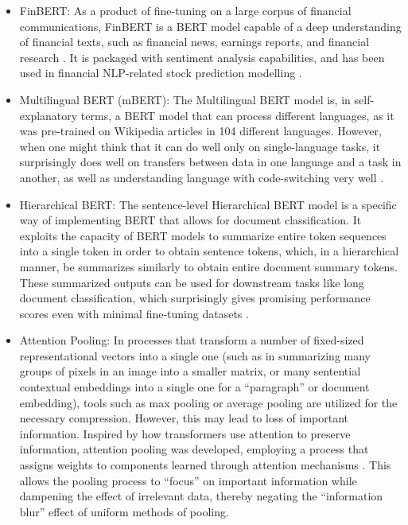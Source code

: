 \documentclass[stu,floatsintext]{apa7}
\begin{document}
\begin{itemize}
\item FinBERT: As a product of fine-tuning on a large corpus of financial communications, FinBERT is a BERT model capable of a deep understanding of financial texts, such as financial news, earnings reports, and financial research \parencite{araci2019finbert}. It is packaged with sentiment analysis capabilities, and has been used in financial NLP-related stock prediction modelling \parencite{chen2024deep}.
\item Multilingual BERT (mBERT): The Multilingual BERT model is, in self-explanatory terms, a BERT model that can process different languages, as it was pre-trained on Wikipedia articles in 104 different languages. However, when one might think that it can do well only on single-language tasks, it surprisingly does well on transfers between data in one language and a task in another, as well as understanding language with code-switching very well \parencite{pires2019how}.
\item Hierarchical BERT: The sentence-level Hierarchical BERT model is a specific way of implementing BERT that allows for document classification. It exploits the capacity of BERT models to summarize entire token sequences into a single token in order to obtain sentence tokens, which, in a hierarchical manner, be summarizes similarly to obtain entire document summary tokens. These summarized outputs can be used for downstream tasks like long document classification, which surprisingly gives promising performance scores even with minimal fine-tuning datasets \parencite{lu2021sentencelevel}.
\item Attention Pooling: In processes that transform a number of fixed-sized representational vectors into a single one (such as in summarizing many groups of pixels in an image into a smaller matrix, or many sentential contextual embeddings into a single one for a “paragraph” or document embedding), tools such as max pooling or average pooling are utilized for the necessary compression. However, this may lead to loss of important information. Inspired by how transformers use attention to preserve information, attention pooling was developed, employing a process that assigns weights to components learned through attention mechanisms \parencite{ji2025ebmgp}. This allows the pooling process to “focus” on important information while dampening the effect of irrelevant data, thereby negating the “information blur” effect of uniform methods of pooling.
\end{itemize}
\end{document}

